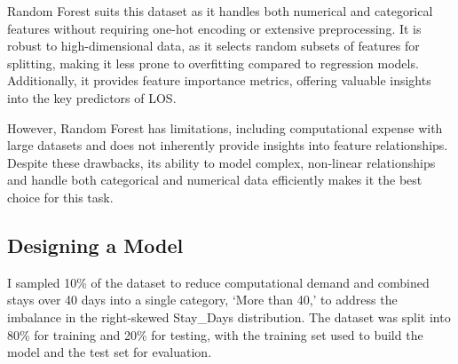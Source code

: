 \documentclass[
]{article}
\begin{document}
Random Forest suits this dataset as it handles both numerical and
categorical features without requiring one-hot encoding or extensive
preprocessing. It is robust to high-dimensional data, as it selects
random subsets of features for splitting, making it less prone to
overfitting compared to regression models. Additionally, it provides
feature importance metrics, offering valuable insights into the key
predictors of LOS.

However, Random Forest has limitations, including computational expense
with large datasets and does not inherently provide insights into
feature relationships. Despite these drawbacks, its ability to model
complex, non-linear relationships and handle both categorical and
numerical data efficiently makes it the best choice for this task.

\subsection{Designing a Model}\label{designing-a-model}

I sampled 10\% of the dataset to reduce computational demand and
combined stays over 40 days into a single category, `More than 40,' to
address the imbalance in the right-skewed Stay\_Days distribution. The
dataset was split into 80\% for training and 20\% for testing, with the
training set used to build the model and the test set for evaluation.
\end{document}
